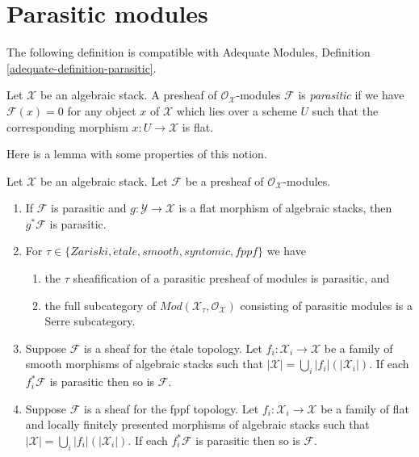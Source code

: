 \section{Parasitic modules}
\label{section-parasitic}

\noindent
The following definition is compatible with
Adequate Modules, Definition \ref{adequate-definition-parasitic}.

\begin{definition}
\label{definition-parasitic}
Let $\mathcal{X}$ be an algebraic stack.
A presheaf of $\mathcal{O}_\mathcal{X}$-modules $\mathcal{F}$ is
{\it parasitic} if we have $\mathcal{F}(x) = 0$ for any object $x$
of $\mathcal{X}$ which lies over a scheme $U$ such that the corresponding
morphism $x : U \to \mathcal{X}$ is flat.
\end{definition}

\noindent
Here is a lemma with some properties of this notion.

\begin{lemma}
\label{lemma-parasitic}
Let $\mathcal{X}$ be an algebraic stack. Let $\mathcal{F}$
be a presheaf of $\mathcal{O}_\mathcal{X}$-modules.
\begin{enumerate}
\item If $\mathcal{F}$ is parasitic and
$g : \mathcal{Y} \to \mathcal{X}$ is a flat morphism of algebraic stacks,
then $g^*\mathcal{F}$ is parasitic.
\item For $\tau \in \{Zariski, \acute{e}tale, smooth, syntomic, fppf\}$
we have
\begin{enumerate}
\item the $\tau$ sheafification of a parasitic presheaf of modules is
parasitic, and
\item the full subcategory of
$\textit{Mod}(\mathcal{X}_\tau, \mathcal{O}_\mathcal{X})$
consisting of parasitic modules is a Serre subcategory.
\end{enumerate}
\item Suppose $\mathcal{F}$ is a sheaf for the \'etale topology.
Let $f_i : \mathcal{X}_i \to \mathcal{X}$ be a family of
smooth morphisms of algebraic stacks such that
$|\mathcal{X}| = \bigcup_i |f_i|(|\mathcal{X}_i|)$. If each
$f_i^*\mathcal{F}$ is parasitic then so is $\mathcal{F}$.
\item Suppose $\mathcal{F}$ is a sheaf for the fppf topology.
Let $f_i : \mathcal{X}_i \to \mathcal{X}$ be a family of
flat and locally finitely presented morphisms of algebraic stacks such that
$|\mathcal{X}| = \bigcup_i |f_i|(|\mathcal{X}_i|)$. If each
$f_i^*\mathcal{F}$ is parasitic then so is $\mathcal{F}$.
\end{enumerate}
\end{lemma}

